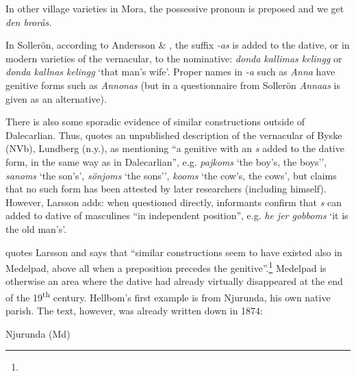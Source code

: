 \begin{styleBodyTextFirst}
In other village varieties in Mora, the possessive pronoun is preposed and we get \textit{den brorås.}

\end{styleBodyTextFirst}

\begin{styleBodytextC}
In Sollerön, according to Andersson \& \citet[357]{Danielsson1999}, the suffix\textit{ -a}\textit{s} is added to the dative, or in modern varieties of the vernacular, to the nominative: \textit{donda kallimas kelingg} or \textit{donda kallnas kelingg} ‘that man’s wife’. Proper names in\textit{ -a} such as \textit{Anna} have genitive forms such as \textit{Annonas }(but in a questionnaire from Sollerön \textit{Annaas} is given as an alternative).

\end{styleBodytextC}

\begin{styleBodytextC}
There is also some sporadic evidence of similar constructions outside of Dalecarlian. Thus, \citet[124]{Larsson1929} quotes an unpublished description of the vernacular of Byske (NVb), Lundberg (n.y.), as mentioning “a genitive with an \textit{s} added to the dative form, in the same way as in Dalecarlian”, e.g. \textit{pajkoms} ‘the boy’s, the boys’’, \textit{sanoms} ‘the son’s’, \textit{sönjoms} ‘the sons’’, \textit{kooms} ‘the cow’s, the cows’, but claims that no such form has been attested by later researchers (including himself). However, Larsson adds: when questioned directly, informants confirm that \textit{s} can added to dative of masculines “in independent position”, e.g. \textit{he jer gobboms} ‘it is the old man’s’. 

\end{styleBodytextC}

\begin{styleBodytextC}
\citet[126]{Hellbom1961} quotes Larsson and says that “similar constructions seem to have existed also in Medelpad, above all when a preposition precedes the genitive”.\footnote{} Medelpad is otherwise an area where the dative had already virtually disappeared at the end of the 19\textsuperscript{th} century. Hellbom’s first example is from Njurunda, his own native parish. The text, however, was already written down in 1874:

\end{styleBodytextC}

\begin{listWWNumileveli}
\item {}

\begin{styleExample}
\label{bkm:Ref126396484}Njurunda (Md)

\end{styleExample}

\end{listWWNumileveli}

